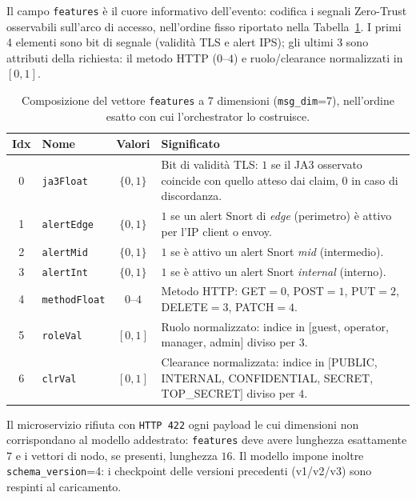 Il campo \texttt{features} è il cuore informativo dell'evento: codifica i segnali Zero-Trust osservabili sull'arco di accesso, nell'ordine fisso riportato nella Tabella~\ref{tab:features7}. I primi 4 elementi sono bit di segnale (validità TLS e alert IPS); gli ultimi 3 sono attributi della richiesta: il metodo HTTP ($0$--$4$) e ruolo/clearance normalizzati in $[0,1]$.

\begin{table}[ht!]
\centering
\footnotesize
\renewcommand{\arraystretch}{1.3}
\begin{tabularx}{\textwidth}{c l c X}
\toprule
\textbf{Idx} & \textbf{Nome} & \textbf{Valori} & \textbf{Significato} \\
\midrule
0 & \texttt{ja3Float}    & $\{0,1\}$ & Bit di validità TLS: $1$ se il JA3 osservato coincide con quello atteso dai claim, $0$ in caso di discordanza. \\
1 & \texttt{alertEdge}   & $\{0,1\}$ & $1$ se un alert Snort di \textit{edge} (perimetro) è attivo per l'IP client o envoy. \\
2 & \texttt{alertMid}    & $\{0,1\}$ & $1$ se è attivo un alert Snort \textit{mid} (intermedio). \\
3 & \texttt{alertInt}    & $\{0,1\}$ & $1$ se è attivo un alert Snort \textit{internal} (interno). \\
4 & \texttt{methodFloat} & $0$–$4$   & Metodo HTTP: GET$=0$, POST$=1$, PUT$=2$, DELETE$=3$, PATCH$=4$. \\
5 & \texttt{roleVal}     & $[0,1]$   & Ruolo normalizzato: indice in $[$guest, operator, manager, admin$]$ diviso per $3$. \\
6 & \texttt{clrVal}      & $[0,1]$   & Clearance normalizzata: indice in $[$PUBLIC, INTERNAL, CONFIDENTIAL, SECRET, TOP\_SECRET$]$ diviso per $4$. \\
\bottomrule
\end{tabularx}
\caption{Composizione del vettore \texttt{features} a 7 dimensioni (\texttt{msg\_dim}=7), nell'ordine esatto con cui l'orchestrator lo costruisce.}
\label{tab:features7}
\end{table}

Il microservizio rifiuta con \texttt{HTTP 422} ogni payload le cui dimensioni non corrispondano al modello addestrato: \texttt{features} deve avere lunghezza esattamente $7$ e i vettori di nodo, se presenti, lunghezza $16$. Il modello impone inoltre \texttt{schema\_version}=4: i checkpoint delle versioni precedenti (v1/v2/v3) sono respinti al caricamento.

